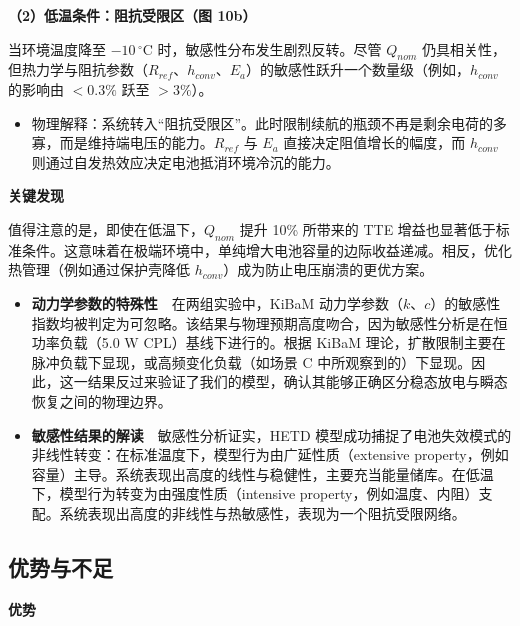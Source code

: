 \documentclass[11pt,a4paper]{ctexart}
\begin{document}
\noindent\textbf{（2）低温条件：阻抗受限区（图 10b）}

当环境温度降至 $-10\,^{\circ}\mathrm{C}$ 时，敏感性分布发生剧烈反转。尽管 $Q_{nom}$ 仍具相关性，但热力学与阻抗参数（$R_{ref}$、$h_{conv}$、$E_a$）的敏感性跃升一个数量级（例如，$h_{conv}$ 的影响由 $< 0.3\%$ 跃至 $> 3\%$）。

\begin{itemize}[leftmargin=1.6em,itemsep=0.4em]
\item 物理解释：系统转入“阻抗受限区”。此时限制续航的瓶颈不再是剩余电荷的多寡，而是维持端电压的能力。$R_{ref}$ 与 $E_a$ 直接决定阻值增长的幅度，而 $h_{conv}$ 则通过自发热效应决定电池抵消环境冷沉的能力。
\end{itemize}

\noindent\textbf{关键发现}

值得注意的是，即使在低温下，$Q_{nom}$ 提升 10\% 所带来的 TTE 增益也显著低于标准条件。这意味着在极端环境中，单纯增大电池容量的边际收益递减。相反，优化热管理（例如通过保护壳降低 $h_{conv}$）成为防止电压崩溃的更优方案。

\begin{itemize}[leftmargin=1.6em,itemsep=0.4em]
\item \textbf{动力学参数的特殊性}　在两组实验中，KiBaM 动力学参数（$k$、$c$）的敏感性指数均被判定为可忽略。该结果与物理预期高度吻合，因为敏感性分析是在恒功率负载（5.0 W CPL）基线下进行的。根据 KiBaM 理论，扩散限制主要在脉冲负载下显现，或高频变化负载（如场景 C 中所观察到的）下显现。因此，这一结果反过来验证了我们的模型，确认其能够正确区分稳态放电与瞬态恢复之间的物理边界。
\end{itemize}

\begin{itemize}[leftmargin=1.6em,itemsep=0.4em]
\item \textbf{敏感性结果的解读}　敏感性分析证实，HETD 模型成功捕捉了电池失效模式的非线性转变：在标准温度下，模型行为由广延性质（extensive property，例如容量）主导。系统表现出高度的线性与稳健性，主要充当能量储库。在低温下，模型行为转变为由强度性质（intensive property，例如温度、内阻）支配。系统表现出高度的非线性与热敏感性，表现为一个阻抗受限网络。
\end{itemize}

\subsection{优势与不足}

\noindent\textbf{优势}
\end{document}
